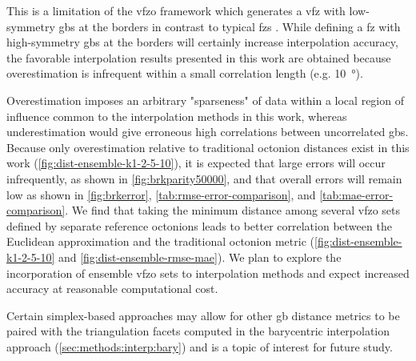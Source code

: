 \documentclass[preprint,12pt]{elsarticle}
\begin{document}
This is a limitation of the \gls{vfzo} framework which generates a \gls{vfz} with low-symmetry \glspl{gb} at the borders in contrast to typical \glspl{fz} \cite{patalaSymmetriesRepresentationGrain2013,homerGrainBoundaryPlane2015}. While defining a \gls{fz} with high-symmetry \glspl{gb} at the borders will certainly increase interpolation accuracy, the favorable interpolation results presented in this work are obtained because overestimation is infrequent within a small correlation length (e.g. \SI{10}{\degree}).

Overestimation imposes an arbitrary "sparseness" of data within a local region of influence common to the interpolation methods in this work, whereas underestimation would give erroneous high correlations between uncorrelated \glspl{gb}. Because only overestimation relative to traditional octonion distances exist in this work (\cref{fig:dist-ensemble-k1-2-5-10}), it is expected that large errors will occur infrequently, as shown in \cref{fig:brkparity50000}, and that overall errors will remain low as shown in \cref{fig:brkerror}, \cref{tab:rmse-error-comparison}, and \cref{tab:mae-error-comparison}. We find that taking the minimum distance among several \gls{vfzo} sets defined by separate reference octonions leads to better correlation between the Euclidean approximation and the traditional octonion metric (\cref{fig:dist-ensemble-k1-2-5-10} and \cref{fig:dist-ensemble-rmse-mae}). We plan to explore the incorporation of ensemble \gls{vfzo} sets to interpolation methods and expect increased accuracy at reasonable computational cost.

Certain simplex-based approaches \cite{connorHighdimensionalSimplexesSupermetric2017,boissonnatOnlyDistancesAre2017} may allow for other \gls{gb} distance metrics \cite{morawiecDistancesGrainInterfaces2019} to be paired with the triangulation facets computed in the barycentric interpolation approach (\cref{sec:methods:interp:bary}) and is a topic of interest for future study.
\end{document}
